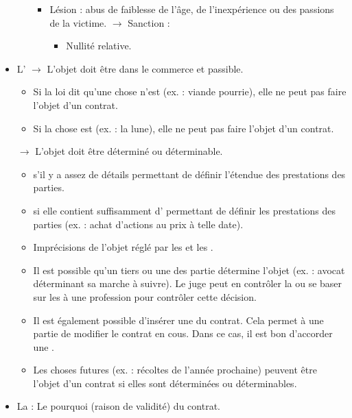 \begin{itemize}
\begin{itemize}
\begin{itemize}
\begin{itemize}
			\end{itemize}
			\item Lésion  : abus de faiblesse de l'âge, de l'inexpérience ou des passions de la victime.
			$\rightarrow$ Sanction :
			\begin{itemize}
				\item Nullité relative.
			\end{itemize}
		\end{itemize}
	\end{itemize}
	\item L'
	$\rightarrow$ L'objet doit être dans le commerce et passible.
	\begin{itemize}
		\item Si la loi dit qu'une chose n'est  (ex. : viande pourrie), elle ne peut pas faire l'objet d'un contrat.
		\item Si la chose est  (ex. : la lune), elle ne peut pas faire l'objet d'un contrat.
	\end{itemize}
	$\rightarrow$ L'objet doit être déterminé ou déterminable.
	\begin{itemize}
		\item {} s'il y a assez de détails permettant de définir l'étendue des prestations des parties.
		\item {} si elle contient suffisamment d' permettant de définir les prestations des parties (ex. : achat d'actions au prix à telle date).
		\item Imprécisions de l'objet réglé par les  et les .
		\item Il est possible qu'un tiers ou une des partie détermine l'objet (ex. : avocat déterminant sa marche à suivre). Le juge peut en contrôler la  ou se baser sur les  à une profession pour contrôler cette décision.
		\item Il est également possible d'insérer une  du contrat. Cela permet à une partie de modifier le contrat en cous. Dans ce cas, il est bon d'accorder une .
		\item Les choses futures (ex. : récoltes de l'année prochaine) peuvent être l'objet d'un contrat si elles sont déterminées ou déterminables.
	\end{itemize}
	\item La  : Le pourquoi (raison de validité) du contrat.

\end{itemize}
